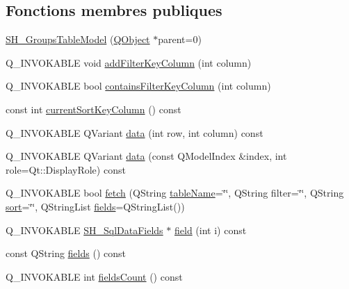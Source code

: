 \subsection*{Fonctions membres publiques}
\begin{DoxyCompactItemize}
\item 
\hyperlink{classSH__GroupsTableModel_a038761e5d85ea2d06867f4b28ffc6677}{S\-H\-\_\-\-Groups\-Table\-Model} (\hyperlink{classQObject}{Q\-Object} $\ast$parent=0)
\item 
Q\-\_\-\-I\-N\-V\-O\-K\-A\-B\-L\-E void \hyperlink{classSH__ExtendedProxyModel_a4e98e24b6b94adf31a2c5e935a48f831}{add\-Filter\-Key\-Column} (int column)
\item 
Q\-\_\-\-I\-N\-V\-O\-K\-A\-B\-L\-E bool \hyperlink{classSH__ExtendedProxyModel_a865da9bd795526dc63b8c6447d59cfc0}{contains\-Filter\-Key\-Column} (int column)
\item 
const int \hyperlink{classSH__ExtendedProxyModel_a76786ad4b81dbd521a610c2f6f973a96}{current\-Sort\-Key\-Column} () const 
\item 
Q\-\_\-\-I\-N\-V\-O\-K\-A\-B\-L\-E Q\-Variant \hyperlink{classSH__ExtendedProxyModel_aca6cc510f740e847e0cfc06e0adb5771}{data} (int row, int column) const 
\item 
Q\-\_\-\-I\-N\-V\-O\-K\-A\-B\-L\-E Q\-Variant \hyperlink{classSH__ExtendedProxyModel_afbc947efbe1107fc5bf8926c52902a1c}{data} (const Q\-Model\-Index \&index, int role=Qt\-::\-Display\-Role) const 
\item 
Q\-\_\-\-I\-N\-V\-O\-K\-A\-B\-L\-E bool \hyperlink{classSH__ExtendedProxyModel_a64f684a4a7d35925ff4f4b81984da60e}{fetch} (Q\-String \hyperlink{classSH__ExtendedProxyModel_aba6e6f8bbde17ea533de3e9a127c804a}{table\-Name}=\char`\"{}\char`\"{}, Q\-String filter=\char`\"{}\char`\"{}, Q\-String \hyperlink{classSH__ExtendedProxyModel_a5ed9b14df78667efe8b22d19617d6c4b}{sort}=\char`\"{}\char`\"{}, Q\-String\-List \hyperlink{classSH__ExtendedProxyModel_addbd48beef730fe7adfaffcaca8b256a}{fields}=Q\-String\-List())
\item 
Q\-\_\-\-I\-N\-V\-O\-K\-A\-B\-L\-E \hyperlink{classSH__SqlDataFields}{S\-H\-\_\-\-Sql\-Data\-Fields} $\ast$ \hyperlink{classSH__ExtendedProxyModel_ac73fae31c6ad69663b4df97f65ec945f}{field} (int i) const 
\item 
const Q\-String \hyperlink{classSH__ExtendedProxyModel_addbd48beef730fe7adfaffcaca8b256a}{fields} () const 
\item 
Q\-\_\-\-I\-N\-V\-O\-K\-A\-B\-L\-E int \hyperlink{classSH__ExtendedProxyModel_a5a5e6b84a9a397e096f4404cec5e9e0c}{fields\-Count} () const 

\end{DoxyCompactItemize}
